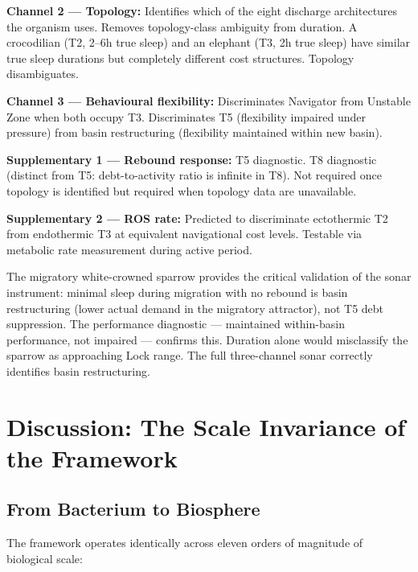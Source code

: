 \documentclass[10pt, a4paper]{article}
\begin{document}
\textbf{Channel 2 --- Topology:}
Identifies which of the eight discharge
architectures the organism uses. Removes
topology-class ambiguity from duration.
A crocodilian (T2, 2--6h true sleep)
and an elephant (T3, 2h true sleep)
have similar true sleep durations but
completely different cost structures.
Topology disambiguates.

\textbf{Channel 3 --- Behavioural
flexibility:}
Discriminates Navigator from Unstable
Zone when both occupy T3. Discriminates
T5 (flexibility impaired under pressure)
from basin restructuring (flexibility
maintained within new basin).

\textbf{Supplementary 1 --- Rebound
response:}
T5 diagnostic. T8 diagnostic (distinct
from T5: debt-to-activity ratio is
infinite in T8). Not required once
topology is identified but required
when topology data are unavailable.

\textbf{Supplementary 2 --- ROS rate:}
Predicted to discriminate ectothermic
T2 from endothermic T3 at equivalent
navigational cost levels. Testable via
metabolic rate measurement during
active period.

The migratory white-crowned sparrow
provides the critical validation of
the sonar instrument: minimal sleep
during migration with no rebound is
basin restructuring (lower actual
demand in the migratory attractor),
not T5 debt suppression. The performance
diagnostic --- maintained within-basin
performance, not impaired --- confirms
this. Duration alone would misclassify
the sparrow as approaching Lock range.
The full three-channel sonar correctly
identifies basin restructuring.

\section{Discussion: The Scale
Invariance of the Framework}
\label{sec:discussion}

\subsection{From Bacterium to Biosphere}

The framework operates identically
across eleven orders of magnitude of
biological scale:
\end{document}
